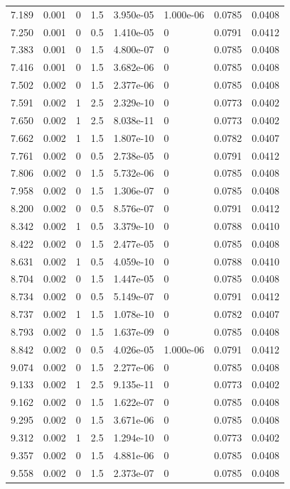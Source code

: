 \documentclass[preview]{standalone}
\begin{document}
{{{\begin{tabular}{L{1.2cm}C{1.2cm} C{0.3cm}C{0.5cm} C{1.4cm}C{1.4cm} C{1.4cm}C{1.4cm}}
  7.189  &  0.001  & 0     & 1.5 &  3.950e-05  & 1.000e-06  & 0.0785 &  0.0408   \\ 
  7.250  &  0.001  & 0     & 0.5 &  1.410e-05  & 0  & 0.0791 &  0.0412   \\ 
  7.383  &  0.001  & 0     & 1.5 &  4.800e-07  & 0  & 0.0785 &  0.0408   \\ 
  7.416  &  0.001  & 0     & 1.5 &  3.682e-06  & 0  & 0.0785 &  0.0408   \\ 
  7.502  &  0.002  & 0     & 1.5 &  2.377e-06  & 0  & 0.0785 &  0.0408   \\ 
  7.591  &  0.002  & 1     & 2.5 &  2.329e-10  & 0  & 0.0773 &  0.0402   \\ 
  7.650  &  0.002  & 1     & 2.5 &  8.038e-11  & 0  & 0.0773 &  0.0402   \\ 
  7.662  &  0.002  & 1     & 1.5 &  1.807e-10  & 0  & 0.0782 &  0.0407   \\ 
  7.761  &  0.002  & 0     & 0.5 &  2.738e-05  & 0  & 0.0791 &  0.0412   \\ 
  7.806  &  0.002  & 0     & 1.5 &  5.732e-06  & 0  & 0.0785 &  0.0408   \\ 
  7.958  &  0.002  & 0     & 1.5 &  1.306e-07  & 0  & 0.0785 &  0.0408   \\ 
  8.200  &  0.002  & 0     & 0.5 &  8.576e-07  & 0  & 0.0791 &  0.0412   \\ 
  8.342  &  0.002  & 1     & 0.5 &  3.379e-10  & 0  & 0.0788 &  0.0410   \\ 
  8.422  &  0.002  & 0     & 1.5 &  2.477e-05  & 0  & 0.0785 &  0.0408   \\ 
  8.631  &  0.002  & 1     & 0.5 &  4.059e-10  & 0  & 0.0788 &  0.0410   \\ 
  8.704  &  0.002  & 0     & 1.5 &  1.447e-05  & 0  & 0.0785 &  0.0408   \\ 
  8.734  &  0.002  & 0     & 0.5 &  5.149e-07  & 0  & 0.0791 &  0.0412   \\ 
  8.737  &  0.002  & 1     & 1.5 &  1.078e-10  & 0  & 0.0782 &  0.0407   \\ 
  8.793  &  0.002  & 0     & 1.5 &  1.637e-09  & 0  & 0.0785 &  0.0408   \\ 
  8.842  &  0.002  & 0     & 0.5 &  4.026e-05  & 1.000e-06  & 0.0791 &  0.0412   \\ 
  9.074  &  0.002  & 0     & 1.5 &  2.277e-06  & 0  & 0.0785 &  0.0408   \\ 
  9.133  &  0.002  & 1     & 2.5 &  9.135e-11  & 0  & 0.0773 &  0.0402   \\ 
  9.162  &  0.002  & 0     & 1.5 &  1.622e-07  & 0  & 0.0785 &  0.0408   \\ 
  9.295  &  0.002  & 0     & 1.5 &  3.671e-06  & 0  & 0.0785 &  0.0408   \\ 
  9.312  &  0.002  & 1     & 2.5 &  1.294e-10  & 0  & 0.0773 &  0.0402   \\ 
  9.357  &  0.002  & 0     & 1.5 &  4.881e-06  & 0  & 0.0785 &  0.0408   \\ 
  9.558  &  0.002  & 0     & 1.5 &  2.373e-07  & 0  & 0.0785 &  0.0408   \\ 
\hline 
\end{tabular} 

}}}
\end{document}
